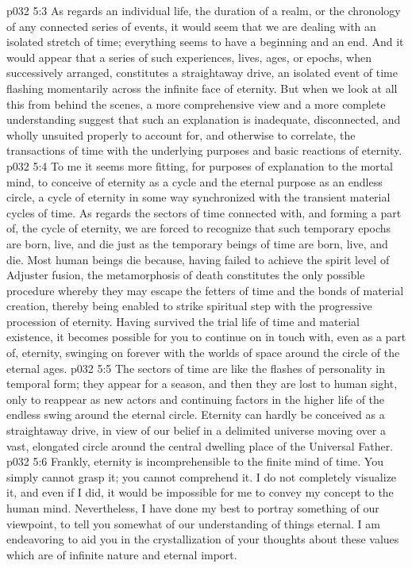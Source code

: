 \vs p032 5:3 \pc As regards an individual life, the duration of a realm, or the chronology of any connected series of events, it would seem that we are dealing with an isolated stretch of time; everything seems to have a beginning and an end. And it would appear that a series of such experiences, lives, ages, or epochs, when successively arranged, constitutes a straightaway drive, an isolated event of time flashing momentarily across the infinite face of eternity. But when we look at all this from behind the scenes, a more comprehensive view and a more complete understanding suggest that such an explanation is inadequate, disconnected, and wholly unsuited properly to account for, and otherwise to correlate, the transactions of time with the underlying purposes and basic reactions of eternity.
\vs p032 5:4 To me it seems more fitting, for purposes of explanation to the mortal mind, to conceive of eternity as a cycle and the eternal purpose as an endless circle, a cycle of eternity in some way synchronized with the transient material cycles of time. As regards the sectors of time connected with, and forming a part of, the cycle of eternity, we are forced to recognize that such temporary epochs are born, live, and die just as the temporary beings of time are born, live, and die. Most human beings die because, having failed to achieve the spirit level of Adjuster fusion, the metamorphosis of death constitutes the only possible procedure whereby they may escape the fetters of time and the bonds of material creation, thereby being enabled to strike spiritual step with the progressive procession of eternity. Having survived the trial life of time and material existence, it becomes possible for you to continue on in touch with, even as a part of, eternity, swinging on forever with the worlds of space around the circle of the eternal ages.
\vs p032 5:5 The sectors of time are like the flashes of personality in temporal form; they appear for a season, and then they are lost to human sight, only to reappear as new actors and continuing factors in the higher life of the endless swing around the eternal circle. Eternity can hardly be conceived as a straightaway drive, in view of our belief in a delimited universe moving over a vast, elongated circle around the central dwelling place of the Universal Father.
\vs p032 5:6 Frankly, eternity is incomprehensible to the finite mind of time. You simply cannot grasp it; you cannot comprehend it. I do not completely visualize it, and even if I did, it would be impossible for me to convey my concept to the human mind. Nevertheless, I have done my best to portray something of our viewpoint, to tell you somewhat of our understanding of things eternal. I am endeavoring to aid you in the crystallization of your thoughts about these values which are of infinite nature and eternal import.

